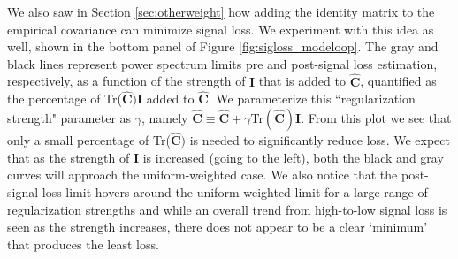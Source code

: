 \documentclass[preprint2,numberedappendix,tighten]{aastex6}
\begin{document}
We also saw in Section \ref{sec:otherweight} how adding the identity matrix to the empirical covariance can minimize signal loss. We experiment with this idea as well, shown in the bottom panel of Figure \ref{fig:sigloss_modeloop}. The gray and black lines represent power spectrum limits pre and post-signal loss estimation, respectively, as a function of the strength of $\textbf{I}$ that is added to $\widehat{\textbf{C}}$, quantified as the percentage of Tr($\widehat{\textbf{C}})\textbf{I}$ added to $\widehat{\textbf{C}}$. We parameterize this ``regularization strength" parameter as $\gamma$, namely $\widehat{\textbf{C}} \equiv \widehat{\textbf{C}} + \gamma$Tr$(\widehat{\textbf{C}})\textbf{I}$. From this plot we see that only a small percentage of Tr($\widehat{\textbf{C}})$ is needed to significantly reduce loss. We expect that as the strength of $\textbf{I}$ is increased (going to the left), both the black and gray curves will approach the uniform-weighted case. We also notice that the post-signal loss limit hovers around the uniform-weighted limit for a large range of regularization strengths and while an overall trend from high-to-low signal loss is seen as the strength increases, there does not appear to be a clear `minimum' that produces the least loss.
\end{document}
